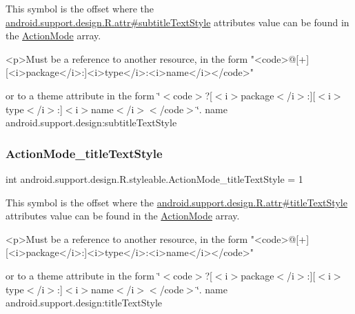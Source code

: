 This symbol is the offset where the \hyperlink{classandroid_1_1support_1_1design_1_1R_1_1attr_a2d8877abb4f0cd5569d1e413558667b7}{android.\+support.\+design.\+R.\+attr\#subtitle\+Text\+Style} attribute\textquotesingle{}s value can be found in the \hyperlink{classandroid_1_1support_1_1design_1_1R_1_1styleable_aece7cc3345738baf4a59955f870e1507}{Action\+Mode} array.

\begin{DoxyVerb}      <p>Must be a reference to another resource, in the form "<code>@[+][<i>package</i>:]<i>type</i>:<i>name</i></code>"
\end{DoxyVerb}
 or to a theme attribute in the form \char`\"{}$<$code$>$?\mbox{[}$<$i$>$package$<$/i$>$\+:\mbox{]}\mbox{[}$<$i$>$type$<$/i$>$\+:\mbox{]}$<$i$>$name$<$/i$>$$<$/code$>$\char`\"{}.  name android.\+support.\+design\+:subtitle\+Text\+Style \mbox{\label{classandroid_1_1support_1_1design_1_1R_1_1styleable_a3bb5c6715ae9f81fdc9431c519839eea}} 
\subsubsection{\texorpdfstring{Action\+Mode\+\_\+title\+Text\+Style}{ActionMode\_titleTextStyle}}
{\footnotesize\ttfamily int android.\+support.\+design.\+R.\+styleable.\+Action\+Mode\+\_\+title\+Text\+Style = 1\hspace{0.3cm}{\ttfamily [static]}}

This symbol is the offset where the \hyperlink{classandroid_1_1support_1_1design_1_1R_1_1attr_a826c283648de1009c659c577c61a5f2f}{android.\+support.\+design.\+R.\+attr\#title\+Text\+Style} attribute\textquotesingle{}s value can be found in the \hyperlink{classandroid_1_1support_1_1design_1_1R_1_1styleable_aece7cc3345738baf4a59955f870e1507}{Action\+Mode} array.

\begin{DoxyVerb}      <p>Must be a reference to another resource, in the form "<code>@[+][<i>package</i>:]<i>type</i>:<i>name</i></code>"
\end{DoxyVerb}
 or to a theme attribute in the form \char`\"{}$<$code$>$?\mbox{[}$<$i$>$package$<$/i$>$\+:\mbox{]}\mbox{[}$<$i$>$type$<$/i$>$\+:\mbox{]}$<$i$>$name$<$/i$>$$<$/code$>$\char`\"{}.  name android.\+support.\+design\+:title\+Text\+Style \mbox{\label{classandroid_1_1support_1_1design_1_1R_1_1styleable_a793c8e02386efdda6b3cf815e635b3fe}} 
